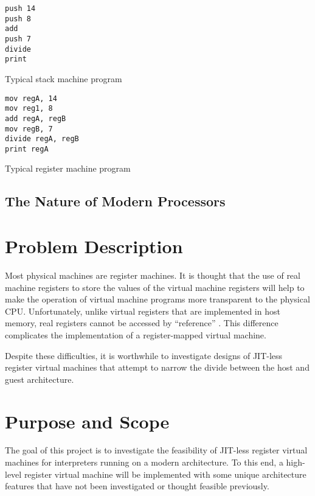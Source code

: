 			\begin{doublefig}
				\begin{halffig}
					\begin{lstlisting}
push 14
push 8
add
push 7
divide
print
					\end{lstlisting}
					\caption{Typical stack machine program}
					\label{fig:stackprogram}
				\end{halffig}
				\begin{halffig}
					\begin{lstlisting}
mov regA, 14
mov reg1, 8
add regA, regB
mov regB, 7
divide regA, regB
print regA
					\end{lstlisting}
					\caption{Typical register machine program}
					\label{fig:registerprogram}
				\end{halffig}
			\end{doublefig}
			
			
		\subsection{The Nature of Modern Processors}
	
	\section{Problem Description}
		Most physical machines are register machines. It is thought that the use of real machine registers to store the values of the virtual machine registers will help to make the operation of virtual machine programs more transparent to the physical CPU. Unfortunately, unlike virtual registers that are implemented in host memory, real registers cannot be accessed by ``reference'' \citep{caseregistervm}. This difference complicates the implementation of a register-mapped virtual machine. 
		
		Despite these difficulties, it is worthwhile to investigate designs of JIT-less register virtual machines that attempt to narrow the divide between the host and guest architecture.
	
		
	\section{Purpose and Scope}
		The goal of this project is to investigate the feasibility of JIT-less register virtual machines for interpreters running on a modern architecture. To this end, a high-level register virtual machine will be implemented with some unique architecture features that have not been investigated or thought feasible previously.
		
